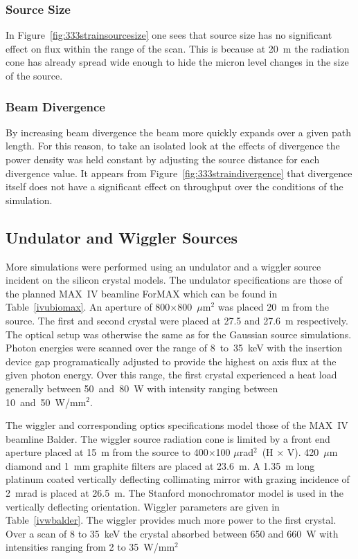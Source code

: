 \documentclass{iucr}
\begin{document}
\subsubsection{Source Size}
In Figure~\ref{fig:333strainsourcesize} one sees that source size has no significant effect on flux within the range of the scan. This is because at 20~m the radiation cone has already spread wide enough to hide the micron level changes in the size of the source.

\subsubsection{Beam Divergence}
By increasing beam divergence the beam more quickly expands over a given path length. For this reason, to take an isolated look at the effects of divergence the power density was held constant by adjusting the source distance for each divergence value. It appears from Figure~\ref{fig:333straindivergence} that divergence itself does not have a significant effect on throughput over the conditions of the simulation.


\subsection{Undulator and Wiggler Sources}\label{undulatorsource}
More simulations were performed using an undulator and a wiggler source incident on the silicon crystal models. The undulator specifications are those of the planned MAX~IV beamline ForMAX which can be found in Table~\ref{ivubiomax}. An aperture of 800$\times$800~$\mu$m$^2$ was placed 20~m from the source. The first and second crystal were placed at 27.5 and 27.6~m respectively. The optical setup was otherwise the same as for the Gaussian source simulations. Photon energies were scanned over the range of 8~to~35~keV with the insertion device gap programatically adjusted to provide the highest on axis flux at the given photon energy. Over this range, the first crystal experienced a heat load generally between 50~and~80~W with intensity ranging between 10~and~50~W/mm$^2$. 

The wiggler and corresponding optics specifications model those of the MAX~IV beamline Balder. The wiggler source radiation cone is limited by a front end aperture placed at 15~m from the source to 400$\times$100 $\mu$rad$^2$~(H $\times$ V). 420~$\mu$m diamond and 1~mm graphite filters are placed at 23.6~m. A 1.35~m long platinum coated vertically deflecting collimating mirror with grazing incidence of 2~mrad is placed at 26.5~m. The Stanford monochromator model is used in the vertically deflecting orientation. Wiggler parameters are given in Table~\ref{ivwbalder}. The wiggler provides much more power to the first crystal. Over a scan of 8 to 35~keV the crystal absorbed between 650 and 660~W with intensities ranging from 2 to 35~W/mm$^2$
\end{document}
